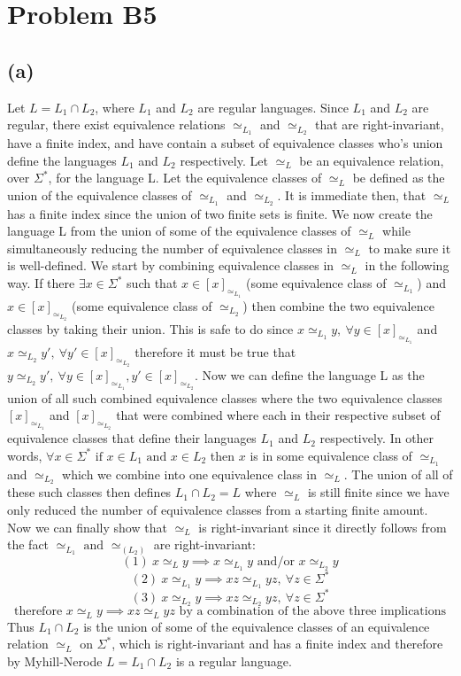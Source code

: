 \documentclass[12pt]{article}
\begin{document}
\section*{Problem B5}
\subsection*{(a)}
Let $L = L_1 \cap L_2$, where $L_1$ and $L_2$ are regular languages. Since
$L_1$ and $L_2$ are regular, there exist equivalence relations $\simeq_{L_1}$
and $\simeq_{L_2}$ that are right-invariant, have a finite index, and have
contain a subset of equivalence classes who's union define the languages
$L_1$ and $L_2$ respectively. Let $\simeq_L$ be an equivalence relation, over
$\Sigma^*$, for the language L. Let the equivalence classes of $\simeq_L$
be defined as the union of the equivalence classes of $\simeq_{L_1}$ and
$\simeq_{L_2}$. It is immediate then, that $\simeq_L$ has a finite index since
the union of two finite sets is finite. We now create the language L from the
union of some of the equivalence classes of $\simeq_L$ while simultaneously
reducing the number of equivalence classes in $\simeq_L$ to make sure it is
well-defined. We start by combining equivalence classes in $\simeq_L$ in the
following way. If there $\exists x \in \Sigma^*$ such that
$x \in [x]_{\simeq_{L_1}}$ (some equivalence class of $\simeq_{L_1}$) and
$x \in [x]_{\simeq_{L_2}}$ (some equivalence class of $\simeq_{L_2}$)
then combine the two equivalence classes by taking their union. This is safe to
do since $x \simeq_{L_1} y,\ \forall y \in [x]_{\simeq_{L_1}}$ and
$x \simeq_{L_2} y',\ \forall y' \in [x]_{\simeq_{L_2}}$ therefore it must be true
that $y \simeq_{L_2} y',\ \forall y \in [x]_{\simeq_{L_1}},
y' \in [x]_{\simeq_{L_2}}$. Now we can define the language L as the union of all
such combined equivalence classes where the two equivalence classes
$[x]_{\simeq_{L_1}}$ and $[x]_{\simeq_{L_2}}$ that were combined where each in
their respective subset of equivalence classes that define their languages
$L_1$ and $L_2$ respectively. In other words, $\forall x \in \Sigma^*
\text{ if } x \in L_1 \text{ and } x \in L_2$ then $x$ is in some equivalence
class of $\simeq_{L_1}$ and $\simeq_{L_2}$ which we combine into one equivalence
class in $\simeq_L$. The union of all of these such classes then defines
$L_1 \cap L_2 = L$ where $\simeq_L$ is still finite since we have only reduced
the number of equivalence classes from a starting finite amount. Now we can
finally show that $\simeq_L$ is right-invariant since it directly follows from
the fact $\simeq_{L_1} \text{ and } \simeq_(L_2)$ are right-invariant:
$$(1)\ x \simeq_L y \implies x \simeq_{L_1} y \text{ and/or } x \simeq_{L_2} y$$
$$(2)\ x \simeq_{L_1} y \implies xz \simeq_{L_1} yz,\ \forall z \in \Sigma^*$$
$$(3)\ x \simeq_{L_2} y \implies xz \simeq_{L_2} yz,\ \forall z \in \Sigma^*$$
$$\text{therefore } x \simeq_L y \implies xz \simeq_L yz \text{ by a combination
of the above three implications}$$
Thus $L_1 \cap L_2$ is the union of some of the equivalence classes of an
equivalence relation $\simeq_L$ on $\Sigma^*$, which is right-invariant and has
a finite index and therefore by Myhill-Nerode $L = L_1 \cap L_2$
is a regular language.
\end{document}
